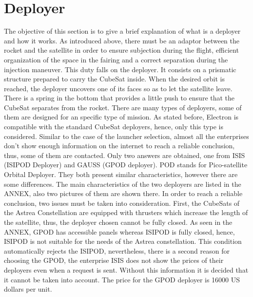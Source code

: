 \section{Deployer}
The objective of this section is to give a brief explanation of what is a deployer and how it works. 
As introduced above, there must be an adaptor between the rocket and the satellite in order to ensure subjection during the flight, efficient organization of the space in the fairing and a correct separation during the injection maneuver. This duty falls on the deployer. It consists on a prismatic structure prepared to carry the CubeSat inside. When the desired orbit is reached, the deployer uncovers one of its faces so as to let the satellite leave. There is a spring in the bottom that provides a little push to ensure that the CubeSat separates from the rocket. 
There are many types of deployers, some of them are designed for an specific type of mission. As stated before, Electron is compatible with the standard CubeSat deployers, hence, only this type is considered. Similar to the case of the launcher selection, almost all the enterprises don't show enough information on the internet to reach a reliable conclusion, thus, some of them are contacted. Only two answers are obtained, one from ISIS (ISIPOD Deployer) and GAUSS (GPOD deployer). POD stands for Pico-satellite Orbital Deployer. 
\newline
They both present similar characteristics, however there are some differences. The main characteristics of the two deployers are listed in the ANNEX, also two pictures of them are shown there.
In order to reach a reliable conclusion, two issues must be taken into consideration. First, the CubeSats of the Astrea Constellation are equipped with thrusters which increase the length of the satellite, thus, the deployer chosen cannot be fully closed. As seen in the ANNEX, GPOD has accessible panels whereas ISIPOD is fully closed, hence, ISIPOD is not suitable for the needs of the Astrea constellation. This condition automatically rejects the ISIPOD, nevertheless, there is a second reason for choosing the GPOD, the enterprise ISIS does not show the prices of their deployers even when a request is sent. Without this information it is decided that it cannot be taken into account. The price for the GPOD  deployer is 16000 US dollars per unit. 

